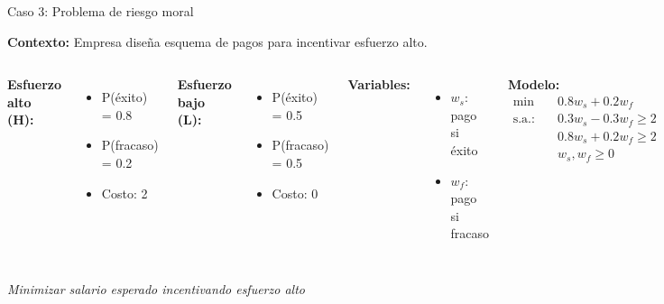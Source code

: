 \documentclass[aspectratio=169,10pt]{beamer}
\begin{document}
\begin{frame}{Caso 3: Problema de riesgo moral}

\textbf{Contexto:} Empresa diseña esquema de pagos para incentivar esfuerzo alto.

\vspace{0.3cm}

\begin{columns}[T]
\textbf{Esfuerzo alto (H):}
\begin{itemize}
    \item P(éxito) = 0.8
    \item P(fracaso) = 0.2
    \item Costo: 2
\end{itemize}

\vspace{0.2cm}

\textbf{Esfuerzo bajo (L):}
\begin{itemize}
    \item P(éxito) = 0.5
    \item P(fracaso) = 0.5
    \item Costo: 0
\end{itemize}

\textbf{Variables:}
\begin{itemize}
    \item $w_s$: pago si éxito
    \item $w_f$: pago si fracaso
\end{itemize}

\vspace{0.2cm}

\textbf{Modelo:}
\begin{align*}
\min \quad & 0.8w_s + 0.2w_f \\
\text{s.a.:} \quad & 0.3w_s - 0.3w_f \geq 2 \\
& 0.8w_s + 0.2w_f \geq 2 \\
& w_s, w_f \geq 0
\end{align*}
\end{columns}

\vspace{0.3cm}

\begin{center}
\textit{Minimizar salario esperado incentivando esfuerzo alto}
\end{center}

\end{frame}
\end{document}
